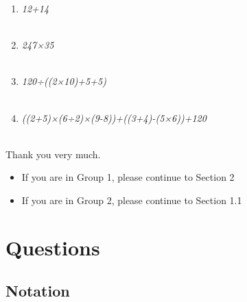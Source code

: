 \documentclass[14pt]{article}
\begin{document}
\begin{enumerate}
\item \emph{12+14}\\

\fbox{
\begin{minipage}{16cm}
\hfill\vspace{3cm}
\end{minipage}
}\\

\item \emph{247×35}\\

\fbox{
\begin{minipage}{16cm}
\hfill\vspace{3cm}
\end{minipage}
}\\

\item \emph{120÷((2×10)+5+5)}\\

\fbox{
\begin{minipage}{16cm}
\hfill\vspace{3cm}
\end{minipage}
}\\

\pagebreak

\item \emph{((2+5)×(6÷2)×(9-8))+((3+4)-(5×6))+120}\\

\fbox{
\begin{minipage}{16cm}
\hfill\vspace{3cm}
\end{minipage}
}\\

\end{enumerate}

Thank you very much.

\begin{itemize}
\item If you are in Group 1, please continue to Section 2
\item If you are in Group 2, please continue to Section 1.1
\end{itemize}

\section{Questions}

\subsection{Notation}
\end{document}
